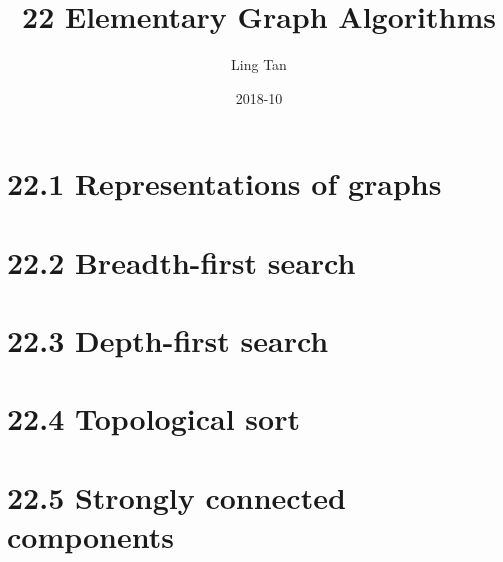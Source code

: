 \documentclass[a4paper]{article}
\title{22 Elementary Graph Algorithms}
\author{Ling Tan}
\date{2018-10}
\begin{document}
\maketitle
\section*{22.1 Representations of graphs}
\section*{22.2 Breadth-first search}
\section*{22.3 Depth-first search}
\section*{22.4 Topological sort}
\section*{22.5 Strongly connected components}
\end{document}
